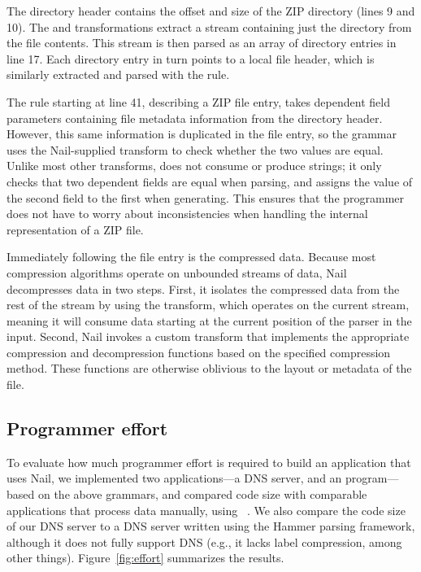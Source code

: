 The directory header contains the offset and size of the ZIP
directory (lines 9 and 10). The  and 
transformations extract a stream containing just the directory from
the file contents. This stream is then parsed as an array of directory
entries in line 17.
Each directory entry in turn points to a local file header, which is
similarly extracted and parsed with the  rule.

The  rule starting at line 41, describing a ZIP file entry,
takes dependent field
parameters containing file metadata information from the directory
header. However, this same information is duplicated in the file
entry, so the grammar uses the Nail-supplied 
transform to check whether the two values are equal. Unlike most other
transforms,  does not consume or produce strings; it
only checks that two dependent fields are equal when parsing, and
assigns the value of the second field to the first when generating.
This ensures that the programmer does not have to worry about
inconsistencies when handling the internal representation of a ZIP
file.

Immediately following the file entry is the compressed data.  Because
most compression algorithms operate on unbounded streams of data, Nail
decompresses data in two steps.  First, it isolates the compressed
data from the rest of the stream by using the  transform,
which operates on the current stream, meaning it will consume data
starting at the current position of the parser in the input.  Second,
Nail invokes a custom  transform that implements
the appropriate compression and decompression functions based on the
specified compression method. These functions are otherwise oblivious
to the layout or metadata of the file.


\subsection{Programmer effort}
\label{s:eval-effort}


To evaluate how much programmer effort is required to build an
application that uses Nail, we implemented two applications---a
DNS server, and an
 program---based on the above grammars, and compared code
size with comparable applications that process data manually, using
~\cite{sloccount}.  We also compare the code size of our
DNS server to a DNS server written using the Hammer parsing framework,
although it does not fully support DNS (e.g., it lacks label compression,
among other things).  Figure~\ref{fig:effort} summarizes the results.

